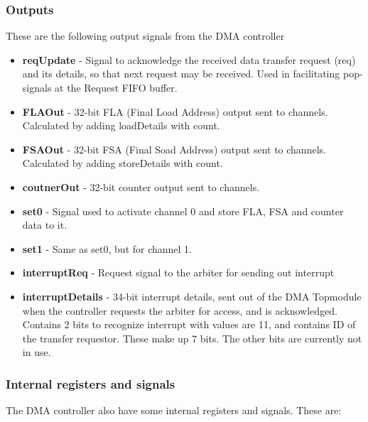 \subsubsection{Outputs}
These are the following output signals from the DMA controller

\begin{itemize}
    \item \textbf{reqUpdate} - Signal to acknowledge the received data transfer request (req) and its details, so that next request may be received.
    Used in facilitating pop-signals at the Request FIFO buffer.
    \item \textbf{FLAOut} - 32-bit FLA (Final Load Address) output sent to channels.
    Calculated by adding loadDetails with count.
    \item \textbf{FSAOut} - 32-bit FSA (Final Soad Address) output sent to channels.
    Calculated by adding storeDetails with count.
    \item \textbf{coutnerOut} - 32-bit counter output sent to channels.
    \item \textbf{set0} - Signal used to activate channel 0 and store FLA, FSA and counter data to it.
    \item \textbf{set1} - Same as set0, but for channel 1.
    \item \textbf{interruptReq} - Request signal to the arbiter for sending out interrupt
    \item \textbf{interruptDetails} - 34-bit interrupt details, sent out of the DMA Topmodule when the controller requests the arbiter for access, and is acknowledged.
    Contains 2 bits to recognize interrupt with values are 11, and contains ID of the transfer requestor. 
    These make up 7 bits. 
    The other bits are currently not in use.
\end{itemize}

\subsubsection{Internal registers and signals}
The DMA controller also have some internal registers and signals.
These are:

